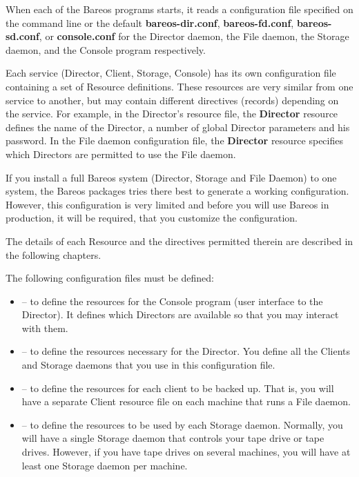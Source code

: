 

When each of the Bareos programs starts, it reads a configuration file
specified on the command line or the default {\bf bareos-dir.conf}, {\bf
bareos-fd.conf}, {\bf bareos-sd.conf}, or {\bf console.conf} for the Director
daemon, the File daemon, the Storage daemon, and the Console program
respectively.

Each service (Director, Client, Storage, Console) has its own configuration
file containing a set of Resource definitions. These resources are very
similar from one service to another, but may contain different directives
(records) depending on the service. For example, in the Director's resource
file, the {\bf Director} resource defines the name of the Director, a number
of global Director parameters and his password. In the File daemon
configuration file, the {\bf Director} resource specifies which Directors are
permitted to use the File daemon.

If you install a full Bareos system (Director, Storage and File Daemon) to one system,
the Bareos packages tries there best to generate a working configuration.
However, this configuration is very limited and before you will use Bareos in production,
it will be required, that you customize the configuration.





The details of each Resource and the directives permitted therein are
described in the following chapters.

The following configuration files must be defined:

\begin{itemize}
\item
    -- to define the resources for
   the Console program (user interface to the Director).  It defines which
Directors are  available so that you may interact with them.
\item
    -- to define the resources
   necessary for the Director. You define all the Clients  and Storage daemons
that you use in this configuration file.
\item
    -- to define the resources for
   each client to be backed up. That is, you will have a separate  Client
resource file on each machine that runs a File daemon.
\item
    -- to define the resources to
   be used by each Storage daemon. Normally, you will have  a single Storage
daemon that controls your tape drive or tape  drives. However, if you have
tape drives on several machines,  you will have at least one Storage daemon
per machine.
\end{itemize}



